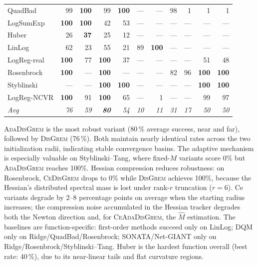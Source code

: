 \documentclass[review,onefignum,onetabnum]{siamart171218}
\begin{document}
\begin{table}[htbp]
\begin{tabular}{l rrrr rr rrrr}
			QuadBad     & 99  & \textbf{100} & 99  & \textbf{100} & --- & --- & 98  & 1   & 1   & 1   \\
			LogSumExp   & \textbf{100} & \textbf{100} & 42  & 53  & --- & --- & --- & --- & --- & --- \\
			Huber       & 26  & \textbf{37}  & 25  & 12  & --- & --- & --- & --- & --- & --- \\
			LinLog      & 62  & 23  & 55  & 21  & 89  & \textbf{100} & --- & --- & --- & --- \\
			LogReg-real & \textbf{100} & 77  & \textbf{100} & 37  & --- & --- & --- & --- & 51  & 48  \\
			Rosenbrock  & \textbf{100} & --- & \textbf{100} & --- & --- & --- & 82  & 96  & \textbf{100} & \textbf{100} \\
			Styblinski  & --- & --- & \textbf{100} & \textbf{100} & --- & --- & --- & --- & \textbf{100} & \textbf{100} \\
			LogReg-NCVR & \textbf{100} & 91  & \textbf{100} & 65  & --- & 1   & --- & --- & 99  & 97  \\
			\textit{Avg} & \textit{76} & \textit{59} & \textbf{\textit{80}} & \textit{54}
			& \textit{10} & \textit{11} & \textit{31} & \textit{17}
			& \textit{50} & \textit{50} \\
			\bottomrule
		\end{tabular}
	\end{table}
	
	\textsc{AdaDisGrem} is the most robust variant
	(80\,\% average success, near and far), followed by \textsc{DisGrem} (76\,\%).
	Both maintain nearly identical rates across the two initialization
	radii, indicating stable convergence basins.
	The adaptive mechanism is especially valuable on
	Styblinski--Tang, where fixed-$M$ variants score 0\% but
	\textsc{AdaDisGrem} reaches 100\%.
	Hessian compression reduces robustness:
	on Rosenbrock, \textsc{CeDisGrem} drops to 0\% while \textsc{DisGrem} achieves 100\%,
	because the Hessian's distributed spectral mass is lost under rank-$r$
	truncation ($r{=}6$).
	Ce variants degrade by 2--8 percentage points on average when
	the starting radius increases; the compression noise accumulated
	in the Hessian tracker degrades both the Newton direction and,
	for \textsc{CeAdaDisGrem}, the $\hat M$ estimation.
	The baselines are function-specific:
	first-order methods succeed only on LinLog; DQM only on
	Ridge/QuadBad/Rosenbrock; SONATA/Net-GIANT only on
	Ridge/Rosenbrock/Styblinski--Tang.
	Huber is the hardest function overall (best rate: 40\,\%),
	due to its near-linear tails and flat curvature regions.
	
\end{document}
